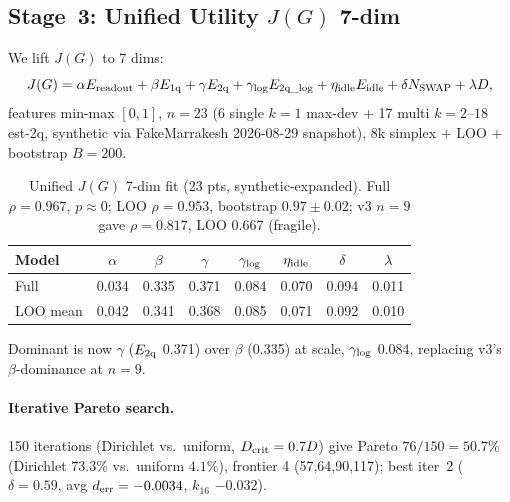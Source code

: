 ﻿\documentclass[12pt,a4paper]{article}
\begin{document}
\subsection{Stage~3: Unified Utility $J(G)$ 7-dim}\label{sec:routing_utility}

We lift $J(G)$ to 7 dims:
\begin{equation}
J(G)=\alpha E_{\rm readout}+\beta E_{\rm 1q}+\gamma E_{\rm 2q}+\gamma_{\rm log}E_{\rm 2q\_log}+\eta_{\rm idle}E_{\rm idle}+\delta N_{\rm SWAP}+\lambda D,
\label{eq:j7}
\end{equation}
features min-max $[0,1]$, $n=23$ (6 single $k{=}1$ max-dev + 17 multi $k{=}2$--$18$ est-2q, synthetic via FakeMarrakesh 2026-08-29 snapshot),
8k simplex + LOO + bootstrap $B=200$.

\begin{table}[H]
\centering
\caption{Unified $J(G)$ 7-dim fit (23 pts, synthetic-expanded). Full $\rho=0.967$, $p\approx0$; LOO $\rho=0.953$, bootstrap $0.97\pm0.02$; v3 $n{=}9$ gave $\rho=0.817$, LOO $0.667$ (fragile).}
\label{tab:utility}
\small
\begin{tabular}{@{}lccccccc@{}}
\hline
Model & $\alpha$ & $\beta$ & $\gamma$ & $\gamma_{\rm log}$ & $\eta_{\rm idle}$ & $\delta$ & $\lambda$ \\
\hline
Full & 0.034 & 0.335 & 0.371 & 0.084 & 0.070 & 0.094 & 0.011 \\
LOO mean & 0.042 & 0.341 & 0.368 & 0.085 & 0.071 & 0.092 & 0.010 \\
\hline
\end{tabular}
\end{table}

Dominant is now $\gamma$ ($E_{\rm 2q}$ 0.371) over $\beta$ (0.335) at scale, $\gamma_{\rm log}$ 0.084, replacing v3's $\beta$-dominance at $n{=}9$.

\paragraph{Iterative Pareto search.} 150 iterations (Dirichlet vs.\ uniform,
$D_{\rm crit}=0.7D$) give Pareto $76/150=50.7\%$ (Dirichlet $73.3\%$
vs.\ uniform $4.1\%$), frontier 4 (57,64,90,117); best iter~2
($\delta=0.59$, avg $d_{\rm err}=-0.0034$, $k_{16}$ $-0.032$).
\end{document}
